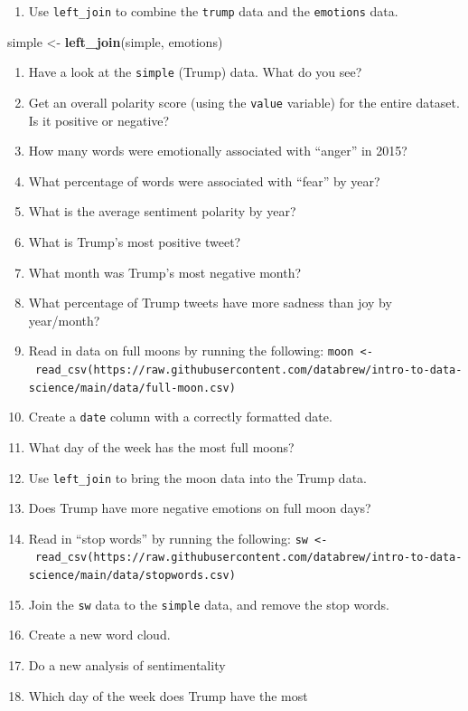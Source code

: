 \documentclass[
]{book}
\newenvironment{Shaded}{\begin{snugshade}}{\end{snugshade}}
\newcommand{\KeywordTok}[1]{\textcolor[rgb]{0.13,0.29,0.53}{\textbf{#1}}}
\newcommand{\NormalTok}[1]{#1}
\newcommand{\StringTok}[1]{\textcolor[rgb]{0.31,0.60,0.02}{#1}}
\providecommand{\tightlist}{%
  \setlength{\itemsep}{0pt}\setlength{\parskip}{0pt}}
\begin{document}
\begin{enumerate}
\def\labelenumi{\arabic{enumi}.}
\setcounter{enumi}{20}
\tightlist
\item
  Use \texttt{left\_join} to combine the \texttt{trump} data and the \texttt{emotions} data.
\end{enumerate}

\begin{Shaded}
\begin{Highlighting}[]
\NormalTok{simple <-}\StringTok{ }\KeywordTok{left_join}\NormalTok{(simple, emotions)}
\end{Highlighting}
\end{Shaded}

\begin{enumerate}
\def\labelenumi{\arabic{enumi}.}
\setcounter{enumi}{21}
\item
  Have a look at the \texttt{simple} (Trump) data. What do you see?
\item
  Get an overall polarity score (using the \texttt{value} variable) for the entire dataset. Is it positive or negative?
\item
  How many words were emotionally associated with ``anger'' in 2015?
\item
  What percentage of words were associated with ``fear'' by year?
\item
  What is the average sentiment polarity by year?
\item
  What is Trump's most positive tweet?
\item
  What month was Trump's most negative month?
\item
  What percentage of Trump tweets have more sadness than joy by year/month?
\item
  Read in data on full moons by running the following: \texttt{moon\ \textless{}-\ read\_csv(\textquotesingle{}https://raw.githubusercontent.com/databrew/intro-to-data-science/main/data/full-moon.csv\textquotesingle{})}
\item
  Create a \texttt{date} column with a correctly formatted date.
\item
  What day of the week has the most full moons?
\item
  Use \texttt{left\_join} to bring the moon data into the Trump data.
\item
  Does Trump have more negative emotions on full moon days?
\item
  Read in ``stop words'' by running the following: \texttt{sw\ \textless{}-\ read\_csv(\textquotesingle{}https://raw.githubusercontent.com/databrew/intro-to-data-science/main/data/stopwords.csv\textquotesingle{})}
\item
  Join the \texttt{sw} data to the \texttt{simple} data, and remove the stop words.
\item
  Create a new word cloud.
\item
  Do a new analysis of sentimentality
\item
  Which day of the week does Trump have the most
\end{enumerate}
\end{document}
